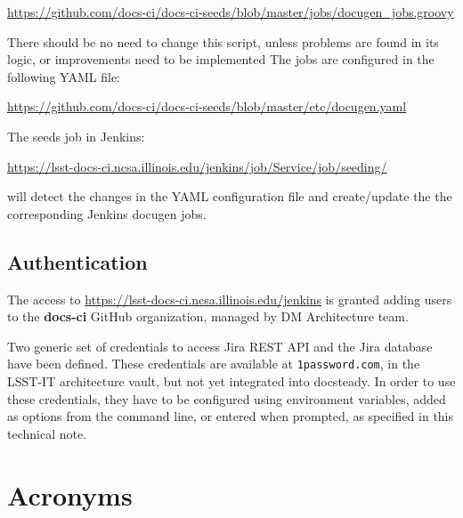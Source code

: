 \documentclass[DM]{lsstdoc}
\begin{document}
\url{https://github.com/docs-ci/docs-ci-seeds/blob/master/jobs/docugen_jobs.groovy}

There should be no need to change this script, unless problems are found in its logic, or improvements need to be implemented
The jobs are configured in the following YAML file:

\url{https://github.com/docs-ci/docs-ci-seeds/blob/master/etc/docugen.yaml}

The seeds job in Jenkins:

\url{https://lsst-docs-ci.ncsa.illinois.edu/jenkins/job/Service/job/seeding/}

will detect the changes in the YAML configuration file and create/update the the corresponding Jenkins docugen jobs.



\subsection{Authentication}\label{sec:auth}

The access to \url{https://lsst-docs-ci.ncsa.illinois.edu/jenkins} is granted adding users to the \textbf{docs-ci} GitHub organization, 
managed by DM Architecture team.

Two generic set of credentials to access Jira REST API and the Jira database have been defined.
These credentials are available at \texttt{1password.com}, in the LSST-IT architecture vault, but not yet integrated into docsteady.
In order to use these credentials, they have to be configured using environment variables, added as options from the command line, or entered when prompted, as specified in this technical note.




\appendix
\section{Acronyms} \label{sec:acronyms}
\end{document}

